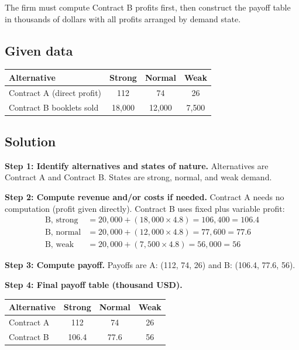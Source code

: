 \begin{ExamProblems}
		The firm must compute Contract B profits first, then construct the payoff table in thousands of dollars with all profits arranged by demand state.
		\subsection*{Given data}
		\begin{center}
			\begin{tabular}{l c c c}
				\toprule
				Alternative & Strong & Normal & Weak \\
				\midrule
				Contract A (direct profit) & 112 & 74 & 26 \\
				Contract B booklets sold & 18{,}000 & 12{,}000 & 7{,}500 \\
				\bottomrule
			\end{tabular}
		\end{center}
		
		\subsection*{Solution}
		\textbf{Step 1: Identify alternatives and states of nature.} Alternatives are Contract A and Contract B. States are strong, normal, and weak demand.
		
		\textbf{Step 2: Compute revenue and/or costs if needed.} Contract A needs no computation (profit given directly). Contract B uses fixed plus variable profit:
		\[
		\begin{aligned}
		\text{B, strong} &= 20{,}000 + (18{,}000 \times 4.8) = 106{,}400 = 106.4 \\
		\text{B, normal} &= 20{,}000 + (12{,}000 \times 4.8) = 77{,}600 = 77.6 \\
		\text{B, weak} &= 20{,}000 + (7{,}500 \times 4.8) = 56{,}000 = 56
		\end{aligned}
		\]
		
		\textbf{Step 3: Compute payoff.} Payoffs are A: (112, 74, 26) and B: (106.4, 77.6, 56).
		
		\textbf{Step 4: Final payoff table (thousand USD).}
		\begin{center}
			\begin{tabular}{l c c c}
				\toprule
				Alternative & Strong & Normal & Weak \\
				\midrule
				Contract A & 112 & 74 & 26 \\
				Contract B & 106.4 & 77.6 & 56 \\
				\bottomrule
			\end{tabular}
		\end{center}
		

\end{ExamProblems}
